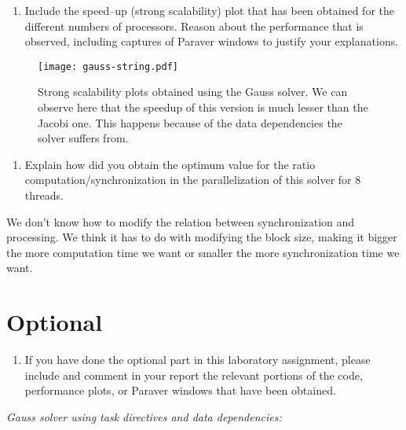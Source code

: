 \documentclass{report}
\begin{document}
\begin{enumerate}[resume]
  \item Include the speed–up (strong scalability) plot that has been obtained for the different numbers of processors. Reason about the performance that is observed, including captures of Paraver windows to justify your explanations.
\end{enumerate}

\begin{SCfigure}[][ht]
  \caption
  {
  Strong scalability plots obtained using the Gauss solver. \break We can observe here that the speedup of this version is much lesser than the Jacobi one. This happens because of the data dependencies the solver suffers from.
  }
  \hspace*{-5cm}
  \texttt{[image: gauss-string.pdf]}
\end{SCfigure}
\clearpage
\begin{enumerate}[resume]
  \item Explain how did you obtain the optimum value for the ratio computation/synchronization in the parallelization of this solver for 8 threads.
\end{enumerate}

We don't know how to modify the relation between synchronization and processing. We think it has to do with modifying the block size, making it bigger the more computation time we want or smaller the more synchronization time we want.

\chapter{Optional}

\begin{enumerate}
  \item If you have done the optional part in this laboratory assignment, please include and comment in your report the relevant portions of the code, performance plots, or Paraver windows that have been obtained.
\end{enumerate}

\emph{Gauss solver using task directives and data dependencies:}
\end{document}
